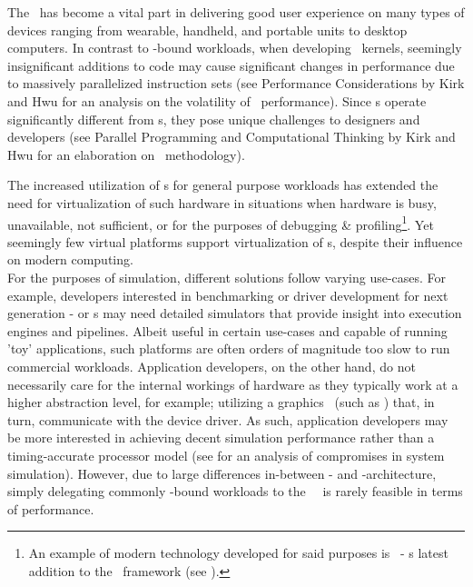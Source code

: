 \noindent
The \dvttermgpu\ has become a vital part in delivering good user experience on many types of devices ranging from wearable, handheld, and portable units to desktop computers. %
In contrast to \dvttermcpu -bound workloads, when developing \dvttermgpu\ kernels, seemingly insignificant additions to code may cause significant changes in performance due to massively parallelized instruction sets (see Performance Considerations by Kirk and Hwu for an analysis on the volatility of \dvttermgpu\ performance).
Since \dvttermgpu s operate significantly different from \dvttermcpu s, they pose unique challenges to designers and developers (see Parallel Programming and Computational Thinking by Kirk and Hwu for an elaboration on \dvttermgpgpu\ methodology).

The increased utilization of \dvttermgpu s for general purpose workloads has extended the need for virtualization of such hardware in situations when hardware is busy, unavailable, not sufficient, or for the purposes of debugging \& profiling\footnote{An example of modern technology developed for said purposes is \dvttermwarp\ - \dvttermmicrosoft s latest addition to the \dvttermdirectx\ framework (see ).}.
Yet seemingly few virtual platforms support virtualization of \dvttermgpu s, despite their influence on modern computing.\\

\noindent
For the purposes of simulation, different solutions follow varying use-cases. For example, developers interested in benchmarking or driver development for next generation \dvttermgpu - or \dvttermcpu s may need detailed simulators that provide insight into execution engines and pipelines.
Albeit useful in certain use-cases and capable of running 'toy' applications, such platforms are often orders of magnitude too slow to run commercial workloads.
Application developers, on the other hand, do not necessarily care for the internal workings of hardware as they typically work at a higher abstraction level, for example; utilizing a graphics \dvttermapi\ (such as \dvttermopengl ) that, in turn, communicate with the device driver.
As such, application developers may be more interested in achieving decent simulation performance rather than a timing-accurate processor model (see  for an analysis of compromises in system simulation).
However, due to large differences in-between \dvttermcpu - and \dvttermgpu -architecture, simply delegating commonly \dvttermgpu -bound workloads to the \dvttermhost\ \dvttermcpu\ is rarely feasible in terms of performance.

